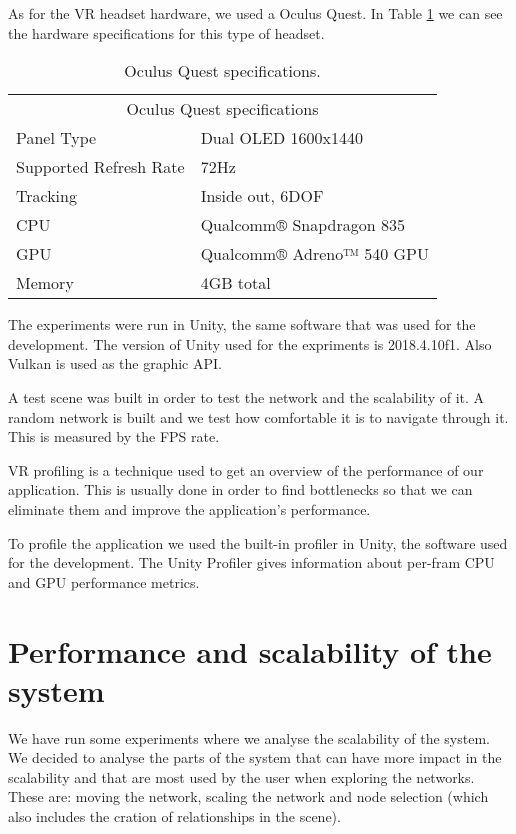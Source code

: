 As for the VR headset hardware, we used a Oculus Quest. In Table \ref{tab:oculus-specs} we can see the hardware specifications for this type of headset.

\begin{table}[h!]
\centering
\begin{tabular}{ll}
\multicolumn{2}{c}{Oculus Quest specifications} \\
Panel Type   & Dual OLED 1600x1440 \\
Supported Refresh Rate  &  72Hz \\
Tracking & Inside out, 6DOF \\
CPU & Qualcomm® Snapdragon 835 \\
GPU & Qualcomm® Adreno™ 540 GPU \\
Memory & 4GB total
\end{tabular}
\caption{Oculus Quest specifications.}
\label{tab:oculus-specs}
\end{table}

The experiments were run in Unity, the same software that was used for the development. The version of Unity used for the expriments is 2018.4.10f1. Also Vulkan is used as the graphic API.

A test scene was built in order to test the network and the scalability of it. A random network is built and we test how comfortable it is to navigate through it. This is measured by the FPS rate.

VR profiling is a technique used to get an overview of the performance of our application. This is usually done in order to find bottlenecks so that we can eliminate them and improve the application's performance.

To profile the application we used the built-in profiler in Unity, the software used for the development. The Unity Profiler gives information about per-fram CPU and GPU performance metrics.

\section{Performance and scalability of the system}

We have run some experiments where we analyse the scalability of the system. We decided to analyse the parts of the system that can have more impact in the scalability and that are most used by the user when exploring the networks. These are: moving the network, scaling the network and node selection (which also includes the cration of relationships in the scene).

